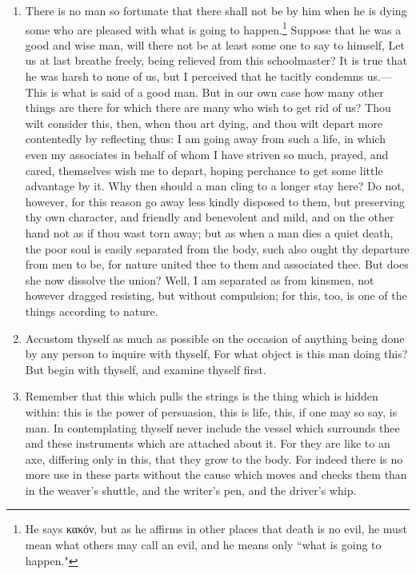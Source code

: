 \begin{enumerate}
\item There is no man so fortunate that there shall not be by him when he is dying some who are pleased with what is going to happen.\footnote{He says \textgreek{κακόν}, but as he affirms in other places that death is no evil, he must mean what others may call an evil, and he means only ``what is going to happen."} Suppose that he was a good and wise man, will there not be at least some one to say to himself, Let us at last breathe freely, being relieved from this schoolmaster? It is true that he was harsh to none of us, but I perceived that he tacitly condemns us.—This is what is said of a good man. But in our own case how many other things are there for which there are many who wish to get rid of us? Thou wilt consider this, then, when thou art dying, and thou wilt depart more contentedly by reflecting thus: I am going away from such a life, in which even my associates in behalf of whom I have striven so much, prayed, and cared, themselves wish me to depart, hoping perchance to get some little advantage by it. Why then should a man cling to a longer stay here? Do not, however, for this reason go away less kindly disposed to them, but preserving thy own character, and friendly and benevolent and mild, and on the other hand not as if thou wast torn away; but as when a man dies a quiet death, the poor soul is easily separated from the body, such also ought thy departure from men to be, for nature united thee to them and associated thee. But does she now dissolve the union? Well, I am separated as from kinsmen, not however dragged resisting, but without compulsion; for this, too, is one of the things according to nature.

\item Accustom thyself as much as possible on the occasion of anything being done by any person to inquire with thyself, For what object is this man doing this? But begin with thyself, and examine thyself first.

\item Remember that this which pulls the strings is the thing which is hidden within: this is the power of persuasion, this is life, this, if one may so say, is man. In contemplating thyself never include the vessel which surrounds thee and these instruments which are attached about it. For they are like to an axe, differing only in this, that they grow to the body. For indeed there is no more use in these parts without the cause which moves and checks them than in the weaver's shuttle, and the writer's pen, and the driver's whip.
\end{enumerate}
